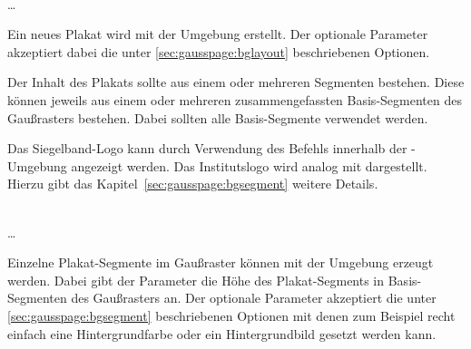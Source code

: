 \begin{Declaration}
    \\
  \quad\dots\\
\end{Declaration}

Ein neues Plakat wird mit der Umgebung  erstellt.
Der optionale Parameter  akzeptiert dabei die
unter \ref{sec:gausspage:bglayout} beschriebenen Optionen.

Der Inhalt des Plakats sollte aus einem oder mehreren Segmenten bestehen.
Diese können jeweils aus einem oder mehreren zusammengefassten Basis-Segmenten
des Gaußrasters bestehen. Dabei sollten alle Basis-Segmente verwendet werden.

\begin{sloppypar}
Das Siegelband-Logo kann durch Verwendung des Befehls 
innerhalb der -Umgebung angezeigt werden.
Das Institutslogo wird analog mit 
dargestellt. Hierzu gibt das Kapitel~\ref{sec:gausspage:bgsegment}
weitere Details.
\end{sloppypar}

\begin{Declaration}
    \\
  \quad\dots\\
\end{Declaration}

Einzelne Plakat-Segmente im Gaußraster können mit der Umgebung
 erzeugt werden.
Dabei gibt der Parameter  die Höhe des
Plakat-Segments in Basis-Segmenten des Gaußrasters an.
Der optionale Parameter  akzeptiert die
unter \ref{sec:gausspage:bgsegment} beschriebenen Optionen mit
denen zum Beispiel recht einfach eine Hintergrundfarbe oder ein Hintergrundbild
gesetzt werden kann.

